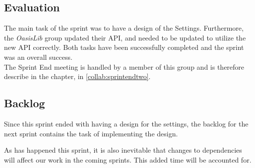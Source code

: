 \subsection*{Evaluation}

The main task of the sprint was to have a design of the Settings.
Furthermore, the \textit{OasisLib} group updated their API, and \launcher needed to be updated to utilize the new API correctly.
Both tasks have been successfully completed and the sprint was an overall success. \\

The Sprint End meeting is handled by a member of this group and is therefore describe in the  chapter, in \cref{collab:sprintendtwo}.

\subsection*{Backlog}

Since this sprint ended with having a design for the settings, the backlog for the next sprint contains the task of implementing the design.

As has happened this sprint, it is also inevitable that changes to dependencies will affect our work in the coming sprints.
This added time will be accounted for.